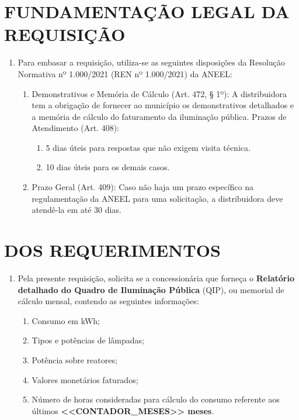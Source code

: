 \newcommand{\tipoRequerimento}{Solicitação do Quadro de Iluminação Pública}

\section{FUNDAMENTAÇÃO LEGAL DA REQUISIÇÃO}

\begin{enumerate}[resume]
\item
  Para embasar a requisição, utiliza-se as seguintes disposições da Resolução Normativa nº 1.000/2021 (REN nº 1.000/2021) da ANEEL:
  \begin{enumerate}
  \item
    Demonstrativos e Memória de Cálculo (Art. 472, § 1º): A distribuidora tem a obrigação de fornecer ao município os demonstrativos detalhados e a memória de cálculo do faturamento da iluminação pública. Prazos de Atendimento (Art. 408):
    \begin{enumerate}
      \item  
      5 dias úteis para respostas que não exigem visita técnica.
      \item 
      10 dias úteis para os demais casos.
    \end{enumerate}
  \item 
  Prazo Geral (Art. 409): Caso não haja um prazo específico na regulamentação da ANEEL para uma solicitação, a distribuidora deve atendê-la em até 30 dias.
  \end{enumerate}
\end{enumerate}

\section{DOS REQUERIMENTOS}

\begin{enumerate}[resume]
\item Pela presente requisição, solicita se a concessionária que forneça o \textbf{Relatório detalhado do Quadro de Iluminação Pública} (QIP), ou memorial de cálculo mensal, contendo as seguintes informações: 
\begin{enumerate}
  \item Consumo em kWh;
  \item Tipos e potências de lâmpadas;
  \item Potência sobre reatores;
  \item Valores monetários faturados;
  \item Número de horas consideradas para cálculo do consumo referente aos últimos \textbf{<<CONTADOR_MESES>> meses}.
\end{enumerate}
\end{enumerate}


